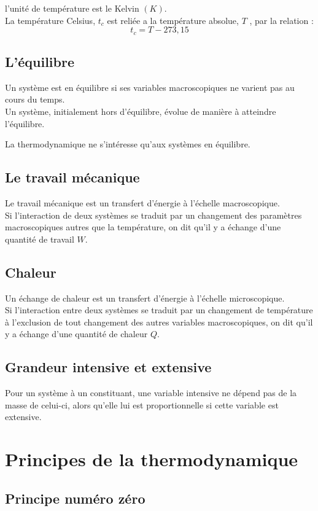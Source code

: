 \documentclass[12pt,oneside]{book}
\begin{document}
l'unité de température est le Kelvin $(K)$.\\
La température Celsius, $t_c$ est reliée a la température absolue, $T$ , par la relation :
\[t_c = T - 273,15\]
\subsection{L'équilibre}
Un système est en équilibre si ses variables macroscopiques ne varient pas au cours du temps.\\
Un système, initialement hors d'équilibre, évolue de manière à atteindre l'équilibre.\\
\begin{center}
	La thermodynamique ne s'intéresse qu'aux systèmes en équilibre.
\end{center}
\subsection{Le travail mécanique}
Le travail mécanique est un transfert d'énergie à l'échelle macroscopique.\\
Si l'interaction de deux systèmes se traduit par un changement des paramètres macroscopiques autres que la température, on dit qu'il y a échange d'une quantité de travail $W$.
\subsection{Chaleur}
Un échange de chaleur est un transfert d'énergie à l'échelle microscopique.\\
Si l'interaction entre deux systèmes se traduit par un changement de température à l'exclusion de tout changement des autres variables macroscopiques, on dit qu'il y a échange d'une quantité de chaleur $Q$.
\subsection{Grandeur intensive et extensive}
Pour un système à un constituant, une variable intensive ne dépend pas de la masse de celui-ci, alors qu'elle lui est proportionnelle si cette variable est extensive.
\section{Principes de la thermodynamique}
\subsection{Principe numéro zéro}
\begin{center}\end{center}
\end{document}
